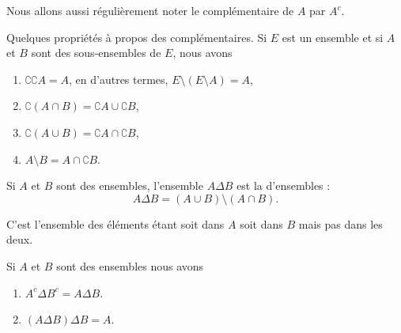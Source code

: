 Nous allons aussi régulièrement noter le complémentaire de \( A\) par \( A^c\).

\begin{lemma}		\label{LemPropsComplement}
	Quelques propriétés à propos des complémentaires. Si $E$ est un ensemble et si $A$ et $B$ sont des sous-ensembles de $E$, nous avons
	\begin{enumerate}
		\item
			$\complement \complement A =A $, en d'autres termes, $E\setminus(E\setminus A)=A$,
		\item
			$\complement(A\cap B)=\complement A\cup\complement B$,
		\item
			$\complement(A\cup B)=\complement A\cap\complement B$,
		\item	\label{ItemLemPropComplementiii}
			$A\setminus B=A\cap\complement B$.
	\end{enumerate}
\end{lemma}

\begin{definition}    \label{DefBMLooVjlSG}
    Si \( A\) et \( B\) sont des ensembles, l'ensemble \( A\Delta B\) est la  d'ensembles :
    \begin{equation}
        A\Delta B=(A\cup B)\setminus(A\cap B).
    \end{equation}
\end{definition}
C'est l'ensemble des éléments étant soit dans \( A\) soit dans \( B\) mais pas dans les deux.

\begin{lemma}   \label{LemCUVoohKpWB}
    Si \( A\) et \( B\) sont des ensembles nous avons
    \begin{enumerate}
        \item\label{ItemVUCooHAztC}
            \( A^c\Delta B^c=A\Delta B\).
        \item\label{ItemVUCooHAztCii}
            \( (A\Delta B)\Delta B=A\).
    \end{enumerate}
\end{lemma}

